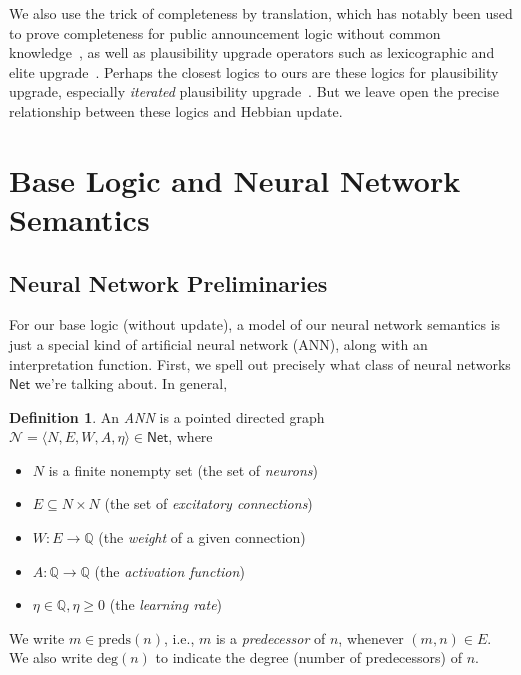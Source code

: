 \documentclass[letterpaper]{article}
\theoremstyle{definition}
\newtheorem{definition}{Definition}
\newcommand{\key}[1]{\emph{#1}}
\newcommand{\Rat}{\mathbb{Q}}
\newcommand{\degree}[1]{\mathrm{deg}(#1)}
\newcommand{\preds}[1]{\mbox{preds}(#1)}
\newcommand{\AllNets}{\mathsf{Net}}
\newcommand{\Net}{\mathcal{N}}
\begin{document}
We also use the trick of completeness by translation, which has notably been used to prove completeness for public announcement logic without common knowledge~\cite{baltag1998PALC, Plaza2007PAL}, as well as plausibility upgrade operators such as lexicographic and elite upgrade~\cite{van2007beliefrevision}.  Perhaps the closest logics to ours are these logics for plausibility upgrade, especially \emph{iterated} plausibility upgrade~\cite{baltag2009iterated}.  But we leave open the precise relationship between these logics and Hebbian update.

\section{Base Logic and Neural Network Semantics}

\subsection{Neural Network Preliminaries}

For our base logic (without update), a model of our neural network semantics is just a special kind of artificial neural network (ANN), along with an interpretation function.  First, we spell out precisely what class of neural networks $\AllNets$ we're talking about.  In general,
\begin{definition}
    An \key{ANN} is a pointed directed graph\\ 
    $\Net = \langle N, E, W, A, \eta \rangle \in \AllNets$, where
    \begin{itemize}
        \item $N$ is a finite nonempty set (the set of \key{neurons})
        \item $E \subseteq N \times N$ (the set of \key{excitatory connections})
        \item $W : E \to \Rat$ (the \key{weight} of a given connection)
        \item $A : \Rat \to \Rat$ (the \key{activation function})
        \item $\eta \in \Rat, \eta \geq 0$ (the \key{learning rate})
    \end{itemize}
    We write $m \in \preds{n}$, i.e., $m$ is a \key{predecessor} of $n$, whenever $(m, n) \in E$.  We also write $\degree{n}$ to indicate the degree (number of predecessors) of $n$.
\end{definition}
\end{document}
